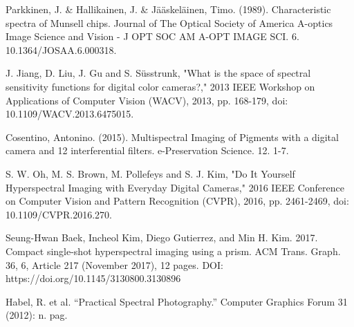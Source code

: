 \documentclass[twocolumn,10pt]{asme2ej}
\begin{document}
 \begin{thebibliography}{12}

 {Parkkinen, J. \& Hallikainen, J. \& Jääskeläinen, Timo. (1989). Characteristic spectra of Munsell chips. Journal of The Optical Society of America A-optics Image Science and Vision - J OPT SOC AM A-OPT IMAGE SCI. 6. 10.1364/JOSAA.6.000318.}
 
{J. Jiang, D. Liu, J. Gu and S. Süsstrunk, "What is the space of spectral sensitivity functions for digital color cameras?," 2013 IEEE Workshop on Applications of Computer Vision (WACV), 2013, pp. 168-179, doi: 10.1109/WACV.2013.6475015.}

{Cosentino, Antonino. (2015). Multispectral Imaging of Pigments with a digital camera and 12 interferential filters. e-Preservation Science. 12. 1-7.}

{S. W. Oh, M. S. Brown, M. Pollefeys and S. J. Kim, "Do It Yourself Hyperspectral Imaging with Everyday Digital Cameras," 2016 IEEE Conference on Computer Vision and Pattern Recognition (CVPR), 2016, pp. 2461-2469, doi: 10.1109/CVPR.2016.270.}

{Seung-Hwan Baek, Incheol Kim, Diego Gutierrez, and Min H. Kim. 2017. Compact single-shot hyperspectral imaging using a prism. ACM Trans. Graph. 36, 6, Article 217 (November 2017), 12 pages. DOI: https://doi.org/10.1145/3130800.3130896}

{Habel, R. et al. “Practical Spectral Photography.” Computer Graphics Forum 31 (2012): n. pag.}

 \end{thebibliography}
 
 
\end{document}
